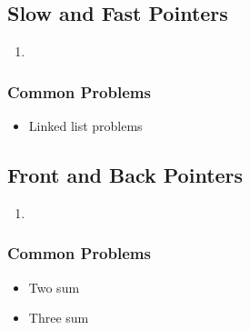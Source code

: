 \subsection{Slow and Fast Pointers}
\begin{algo}
    \begin{enumerate}
        \item 
    \end{enumerate}
\end{algo}

\subsubsection{Common Problems}
\begin{notes}
    \begin{itemize}
        \item Linked list problems
    \end{itemize}
\end{notes}

\subsection{Front and Back Pointers}
\begin{algo}
    \begin{enumerate}
        \item 
    \end{enumerate}
\end{algo}

\subsubsection{Common Problems}
\begin{notes}
    \begin{itemize}
        \item Two sum 
        \item Three sum
    \end{itemize}
\end{notes}
